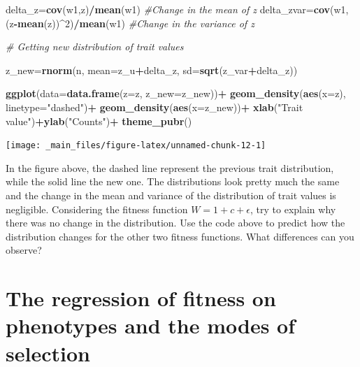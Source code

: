 \documentclass[
]{book}
\newenvironment{Shaded}{\begin{snugshade}}{\end{snugshade}}
\newcommand{\AttributeTok}[1]{\textcolor[rgb]{0.13,0.29,0.53}{#1}}
\newcommand{\CommentTok}[1]{\textcolor[rgb]{0.56,0.35,0.01}{\textit{#1}}}
\newcommand{\DecValTok}[1]{\textcolor[rgb]{0.00,0.00,0.81}{#1}}
\newcommand{\FunctionTok}[1]{\textcolor[rgb]{0.13,0.29,0.53}{\textbf{#1}}}
\newcommand{\NormalTok}[1]{#1}
\newcommand{\OtherTok}[1]{\textcolor[rgb]{0.56,0.35,0.01}{#1}}
\newcommand{\SpecialCharTok}[1]{\textcolor[rgb]{0.81,0.36,0.00}{\textbf{#1}}}
\newcommand{\StringTok}[1]{\textcolor[rgb]{0.31,0.60,0.02}{#1}}
\begin{document}
\begin{Shaded}
\begin{Highlighting}[]
\NormalTok{delta\_z}\OtherTok{=}\FunctionTok{cov}\NormalTok{(w1,z)}\SpecialCharTok{/}\FunctionTok{mean}\NormalTok{(w1) }\CommentTok{\#Change in the mean of z}
\NormalTok{delta\_zvar}\OtherTok{=}\FunctionTok{cov}\NormalTok{(w1,(z}\SpecialCharTok{{-}}\FunctionTok{mean}\NormalTok{(z))}\SpecialCharTok{\^{}}\DecValTok{2}\NormalTok{)}\SpecialCharTok{/}\FunctionTok{mean}\NormalTok{(w1) }\CommentTok{\#Change in the variance of z}

\CommentTok{\# Getting new distribution of trait values}

\NormalTok{z\_new}\OtherTok{=}\FunctionTok{rnorm}\NormalTok{(n, }\AttributeTok{mean=}\NormalTok{z\_u}\SpecialCharTok{+}\NormalTok{delta\_z, }\AttributeTok{sd=}\FunctionTok{sqrt}\NormalTok{(z\_var}\SpecialCharTok{+}\NormalTok{delta\_z))}

\FunctionTok{ggplot}\NormalTok{(}\AttributeTok{data=}\FunctionTok{data.frame}\NormalTok{(}\AttributeTok{z=}\NormalTok{z, }\AttributeTok{z\_new=}\NormalTok{z\_new))}\SpecialCharTok{+}
  \FunctionTok{geom\_density}\NormalTok{(}\FunctionTok{aes}\NormalTok{(}\AttributeTok{x=}\NormalTok{z), }\AttributeTok{linetype=}\StringTok{"dashed"}\NormalTok{)}\SpecialCharTok{+}
  \FunctionTok{geom\_density}\NormalTok{(}\FunctionTok{aes}\NormalTok{(}\AttributeTok{x=}\NormalTok{z\_new))}\SpecialCharTok{+}
  \FunctionTok{xlab}\NormalTok{(}\StringTok{"Trait value"}\NormalTok{)}\SpecialCharTok{+}\FunctionTok{ylab}\NormalTok{(}\StringTok{"Counts"}\NormalTok{)}\SpecialCharTok{+}
  \FunctionTok{theme\_pubr}\NormalTok{()}
\end{Highlighting}
\end{Shaded}

\texttt{[image: \_main\_files/figure-latex/unnamed-chunk-12-1]}

In the figure above, the dashed line represent the previous trait distribution, while the solid line the new one. The distributions look pretty much the same and the change in the mean and variance of the distribution of trait values is negligible. Considering the fitness function \(W=1+c+\epsilon\), try to explain why there was no change in the distribution. Use the code above to predict how the distribution changes for the other two fitness functions. What differences can you observe?

\hypertarget{the-regression-of-fitness-on-phenotypes-and-the-modes-of-selection}{%
\section{The regression of fitness on phenotypes and the modes of selection}\label{the-regression-of-fitness-on-phenotypes-and-the-modes-of-selection}}
\end{document}

